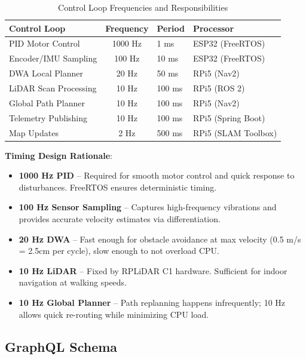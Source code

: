 \documentclass[11pt,letterpaper]{article}
\begin{document}
\begin{table}[H]
\centering
\caption{Control Loop Frequencies and Responsibilities}
\begin{tabular}{|l|c|l|l|}
\hline
\textbf{Control Loop} & \textbf{Frequency} & \textbf{Period} & \textbf{Processor} \\
\hline
PID Motor Control & 1000 Hz & 1 ms & ESP32 (FreeRTOS) \\
\hline
Encoder/IMU Sampling & 100 Hz & 10 ms & ESP32 (FreeRTOS) \\
\hline
DWA Local Planner & 20 Hz & 50 ms & RPi5 (Nav2) \\
\hline
LiDAR Scan Processing & 10 Hz & 100 ms & RPi5 (ROS 2) \\
\hline
Global Path Planner & 10 Hz & 100 ms & RPi5 (Nav2) \\
\hline
Telemetry Publishing & 10 Hz & 100 ms & RPi5 (Spring Boot) \\
\hline
Map Updates & 2 Hz & 500 ms & RPi5 (SLAM Toolbox) \\
\hline
\end{tabular}
\end{table}

\textbf{Timing Design Rationale}:
\begin{itemize}
    \item \textbf{1000 Hz PID} -- Required for smooth motor control and quick response to disturbances. FreeRTOS ensures deterministic timing.

    \item \textbf{100 Hz Sensor Sampling} -- Captures high-frequency vibrations and provides accurate velocity estimates via differentiation.

    \item \textbf{20 Hz DWA} -- Fast enough for obstacle avoidance at max velocity (0.5 m/s = 2.5cm per cycle), slow enough to not overload CPU.

    \item \textbf{10 Hz LiDAR} -- Fixed by RPLiDAR C1 hardware. Sufficient for indoor navigation at walking speeds.

    \item \textbf{10 Hz Global Planner} -- Path replanning happens infrequently; 10 Hz allows quick re-routing while minimizing CPU load.
\end{itemize}

\subsection{GraphQL Schema}
\end{document}
